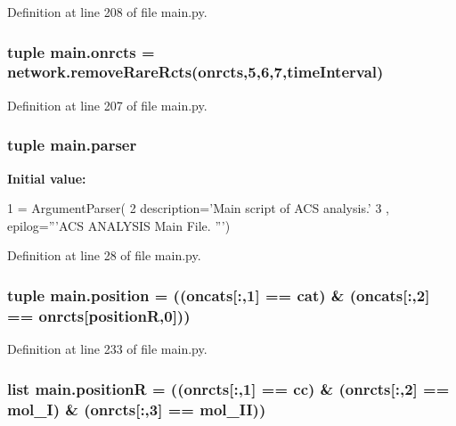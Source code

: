 Definition at line 208 of file main.\-py.

\hypertarget{a00117_ab26ffc3eda5d201a779d705813b06348}{
\subsubsection[{onrcts}]{\setlength{\rightskip}{0pt plus 5cm}tuple main.\-onrcts = network.\-remove\-Rare\-Rcts(onrcts,5,6,7,{\bf time\-Interval})}}\label{a00117_ab26ffc3eda5d201a779d705813b06348}


Definition at line 207 of file main.\-py.

\hypertarget{a00117_a6596d20927a9196bbb33aef704e88297}{
\subsubsection[{parser}]{\setlength{\rightskip}{0pt plus 5cm}tuple main.\-parser}}\label{a00117_a6596d20927a9196bbb33aef704e88297}
{\bfseries Initial value\-:}
\begin{DoxyCode}
1 = ArgumentParser(
2                                 description=\textcolor{stringliteral}{'Main script of ACS analysis.'}
3                                 , epilog=\textcolor{stringliteral}{'''ACS ANALYSIS Main File. '''})
\end{DoxyCode}


Definition at line 28 of file main.\-py.

\hypertarget{a00117_ac67c60df3cc9afae7e4888d2b48b846d}{
\subsubsection[{position}]{\setlength{\rightskip}{0pt plus 5cm}tuple main.\-position = (({\bf oncats}\mbox{[}\-:,1\mbox{]} == {\bf cat}) \& ({\bf oncats}\mbox{[}\-:,2\mbox{]} == {\bf onrcts}\mbox{[}{\bf position\-R},0\mbox{]}))}}\label{a00117_ac67c60df3cc9afae7e4888d2b48b846d}


Definition at line 233 of file main.\-py.

\hypertarget{a00117_adbbdc0f6ad0f08400b3e492f7a807a6b}{
\subsubsection[{position\-R}]{\setlength{\rightskip}{0pt plus 5cm}list main.\-position\-R = (({\bf onrcts}\mbox{[}\-:,1\mbox{]} == {\bf cc}) \& ({\bf onrcts}\mbox{[}\-:,2\mbox{]} == {\bf mol\-\_\-\-I}) \& ({\bf onrcts}\mbox{[}\-:,3\mbox{]} == {\bf mol\-\_\-\-I\-I}))}}\label{a00117_adbbdc0f6ad0f08400b3e492f7a807a6b}


